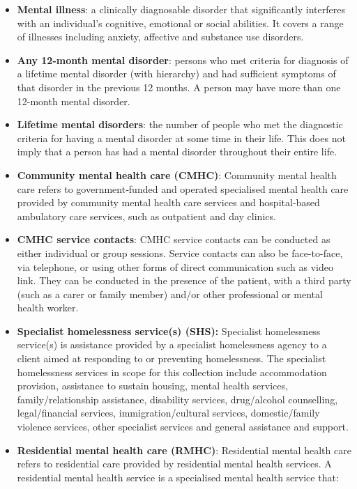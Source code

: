 \documentclass[
  a4paper,
  DIV=11,
  numbers=noendperiod]{scrreport}
\begin{document}
\begin{itemize}
\item
  \textbf{Mental illness}: a clinically diagnosable disorder that
  significantly interferes with an individual's cognitive, emotional or
  social abilities. It covers a range of illnesses including anxiety,
  affective and substance use disorders.
\item
  \textbf{Any 12-month mental disorder}: persons who met criteria for
  diagnosis of a lifetime mental disorder (with hierarchy) and had
  sufficient symptoms of that disorder in the previous 12 months. A
  person may have more than one 12-month mental disorder.
\item
  \textbf{Lifetime mental disorders}: the number of people who met the
  diagnostic criteria for having a mental disorder at some time in their
  life. This does not imply that a person has had a mental disorder
  throughout their entire life.
\item
  \textbf{Community mental health care (CMHC)}: Community mental health
  care refers to government‑funded and operated specialised mental
  health care provided by community mental health care services and
  hospital‑based ambulatory care services, such as outpatient and day
  clinics.
\item
  \textbf{CMHC service contacts}: CMHC service contacts can be conducted
  as either individual or group sessions. Service contacts can also be
  face-to-face, via telephone, or using other forms of direct
  communication such as video link. They can be conducted in the
  presence of the patient, with a third party (such as a carer or family
  member) and/or other professional or mental health worker.
\item
  \textbf{Specialist homelessness service(s) (SHS):} Specialist
  homelessness service(s) is assistance provided by a specialist
  homelessness agency to a client aimed at responding to or preventing
  homelessness. The specialist homelessness services in scope for this
  collection include accommodation provision, assistance to sustain
  housing, mental health services, family/relationship assistance,
  disability services, drug/alcohol counselling, legal/financial
  services, immigration/cultural services, domestic/family violence
  services, other specialist services and general assistance and
  support.
\item
  \textbf{Residential mental health care (RMHC)}: Residential mental
  health care refers to residential care provided by residential mental
  health services. A residential mental health service is a specialised
  mental health service that:


\end{itemize}
\end{document}
